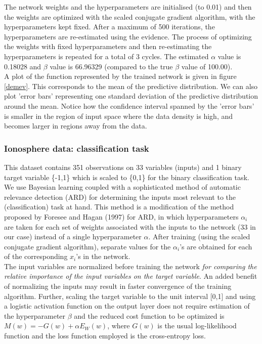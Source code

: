 \documentclass[paper=a4, fontsize=11pt]{scrartcl} %
\numberwithin{equation}{section} %
\begin{document}
The network weights and the hyperparameters are initialised (to 0.01) and then the weights are optimized with the scaled conjugate gradient algorithm, with the hyperparameters kept fixed. After a maximum of 500 iterations, the hyperparameters are re-estimated using the evidence. The process of optimizing the weights with fixed hyperparameters and then re-estimating the hyperparameters is repeated for a total of 3 cycles. The estimated $\alpha$ value is 0.18028 and $\beta$ value is 66.96329 (compared to the true $\beta$ value of 100.00).\\

A plot of the function represented by the trained network is given in figure \ref{demev}. This corresponds to the mean of the predictive distribution. We can also plot 'error bars' representing one standard deviation of the predictive distribution around the mean. Notice how the confidence interval spanned by the 'error bars' is smaller in the region of input space where the data density is high, and becomes larger in regions away from the data.

\subsubsection*{Ionosphere data: classification task}
This dataset contains 351 observations on 33 variables (inputs) and 1 binary target variable \{-1,1\} which is scaled to \{0,1\} for the binary classification task. We use Bayesian learning coupled with a sophisticated method of automatic relevance detection (ARD) for determining the inputs most relevant to the (classification) task at hand. This method is a modification of the method proposed by Foresee and Hagan (1997) for ARD, in which hyperparameters $\alpha_i$ are taken for each set of weights associated with the inputs to the network (33 in our case) instead of a single hyperparameter $\alpha$. After training (using the scaled conjugate gradient algorithm), separate values for the $\alpha_i$'s are obtained for each of the corresponding $x_i$'s in the network.\\

The input variables are normalized before training the network \emph{for comparing the relative importance of the input variables on the target variable}. An added benefit of normalizing the inputs may result in faster convergence of the training algorithm. Further, scaling the target variable to the unit interval [0,1] and using a logistic activation function on the output layer does not require estimation of the hyperparameter $\beta$ and the reduced cost function to be optimized is $M(w) = -G(w) + \alpha E_W(w)$, where $G(w)$ is the usual log-likelihood function and the loss function employed is the cross-entropy loss.\\
\end{document}
